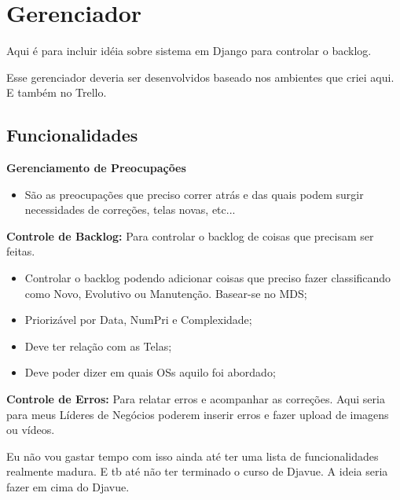 \chapter{Gerenciador}

Aqui é para incluir idéia sobre sistema em Django para controlar o backlog.


Esse gerenciador deveria ser desenvolvidos baseado nos ambientes que criei aqui. E também no Trello.



\section{Funcionalidades}


\textbf{Gerenciamento de Preocupações}
\begin{itemize}
	\item São as preocupações que preciso correr atrás e das quais podem surgir necessidades de correções, telas novas, etc...
\end{itemize}


\textbf{Controle de Backlog:} Para controlar o backlog de coisas que precisam ser feitas.
\begin{itemize}
	\item Controlar o backlog podendo adicionar coisas que preciso fazer classificando como Novo, Evolutivo ou Manutenção. Basear-se no MDS;
	\item Priorizável por Data, NumPri e Complexidade;
	\item Deve ter relação com as Telas;
	\item Deve poder dizer em quais OSs aquilo foi abordado;
\end{itemize}


\textbf{Controle de Erros:} Para relatar erros e acompanhar as correções. Aqui seria para meus Líderes de Negócios poderem inserir erros e fazer upload de imagens ou vídeos.

Eu não vou gastar tempo com isso ainda até ter uma lista de funcionalidades realmente madura. E tb até não ter terminado o curso de Djavue. A ideia seria fazer em cima do Djavue.




